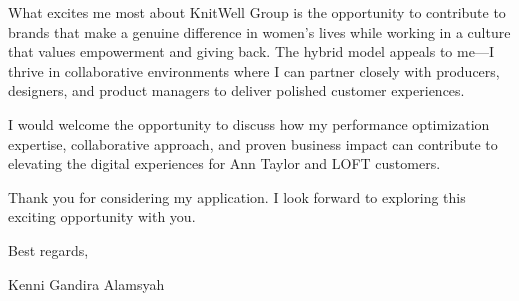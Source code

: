 \documentclass[11pt]{article}
\begin{document}
\vspace{0.8em}

What excites me most about KnitWell Group is the opportunity to contribute to brands that make a genuine difference in women's lives while working in a culture that values empowerment and giving back. The hybrid model appeals to me---I thrive in collaborative environments where I can partner closely with producers, designers, and product managers to deliver polished customer experiences.

\vspace{0.8em}

I would welcome the opportunity to discuss how my performance optimization expertise, collaborative approach, and proven business impact can contribute to elevating the digital experiences for Ann Taylor and LOFT customers.

\vspace{0.8em}

Thank you for considering my application. I look forward to exploring this exciting opportunity with you.

\vspace{1.5em}

\noindent Best regards,

\vspace{0.5em}

\noindent Kenni Gandira Alamsyah
\end{document}

